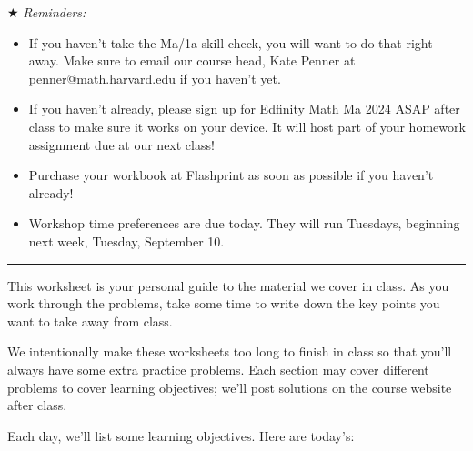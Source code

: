 \documentclass{article}
\makeatletter
\newlength{\tipmargin}
\renewenvironment{framed}{
  \setlength{\tipmargin}{\textwidth-\linewidth}
  \advance\@totalleftmargin-\tipmargin
  \def\FrameCommand{\hspace{\tipmargin}\fbox}%
  \advance\linewidth\tipmargin
  \MakeFramed {\advance\hsize-\width \FrameRestore}%
}
{\endMakeFramed}
\makeatother
\begin{document}

  \begin{problemonly}
    $\bigstar$ \emph{Reminders:}
    \begin{itemize}
    \item If you haven't take the Ma/1a skill check, you will want to do that right away. Make sure to email our course head, Kate Penner at penner@math.harvard.edu if you haven't yet.
    \item If you haven't already, please sign up for Edfinity Math Ma 2024 ASAP after class to make sure it works on your device. It will host part of your homework assignment due at our next class!
    \item Purchase your workbook at Flashprint as soon as possible if you haven't already!
    \item Workshop time preferences are due today. They will run Tuesdays, beginning next week, Tuesday, September 10.
    \end{itemize}

    \begin{center}
      \rule{5in}{0.4pt}
    \end{center}

    This worksheet is your personal guide to the material we cover in class. As you work through the problems, take some time to write down the key points you want to take away from class.

    We intentionally make these worksheets too long to finish in class so that you'll always have some extra practice problems. Each section may cover different problems to cover learning objectives; we'll post solutions on the course website after class. 

    Each day, we'll list some learning objectives. Here are today's: 
  \end{problemonly}

\end{document}
